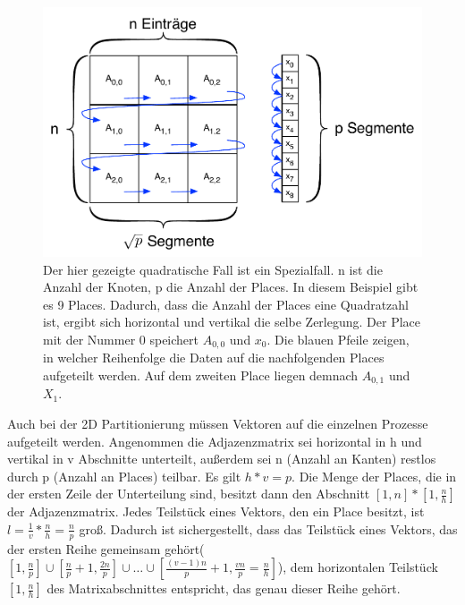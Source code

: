 \begin{figure}[ht]
\centering
	\label{img:2d-decomposition}
	\includegraphics{pics/2d-decomposition.pdf}
	\caption{Der hier gezeigte quadratische Fall ist ein Spezialfall. n ist die Anzahl der Knoten, p die Anzahl der Places. In diesem Beispiel gibt es 9 Places. Dadurch, dass die Anzahl der Places eine Quadratzahl ist, ergibt sich horizontal und vertikal die selbe Zerlegung. Der Place mit der Nummer 0 speichert $A_{0,0}$ und $x_0$. Die blauen Pfeile zeigen, in welcher Reihenfolge die Daten auf die nachfolgenden Places aufgeteilt werden. Auf dem zweiten Place liegen demnach $A_{0,1}$ und $X_1$.}
\end{figure}

Auch bei der 2D Partitionierung müssen Vektoren auf die einzelnen Prozesse aufgeteilt werden. Angenommen die Adjazenzmatrix sei horizontal in h und vertikal in v Abschnitte unterteilt, außerdem sei n (Anzahl an Kanten) restlos durch p (Anzahl an Places) teilbar. Es gilt $h*v=p$. Die Menge der Places, die in der ersten Zeile der Unterteilung sind, besitzt dann den Abschnitt $ \left[1,n\right] * \left[1,\frac{n}{h}\right]$ der Adjazenzmatrix. Jedes Teilstück eines Vektors, den ein Place besitzt, ist  $l = \frac{1}{v} * \frac{n}{h} = \frac{n}{p}$ groß. Dadurch ist sichergestellt, dass das Teilstück eines Vektors, das der ersten Reihe gemeinsam gehört($\left[1,\frac{n}{p}\right] \cup \left[\frac{n}{p}+1,\frac{2n}{p}\right] \cup \dots \cup \left[\frac{(v-1)n}{p}+1,\frac{vn}{p}=\frac{n}{h}\right] $), dem horizontalen Teilstück $\left[1,\frac{n}{h}\right]$ des Matrixabschnittes entspricht, das genau dieser Reihe gehört.


